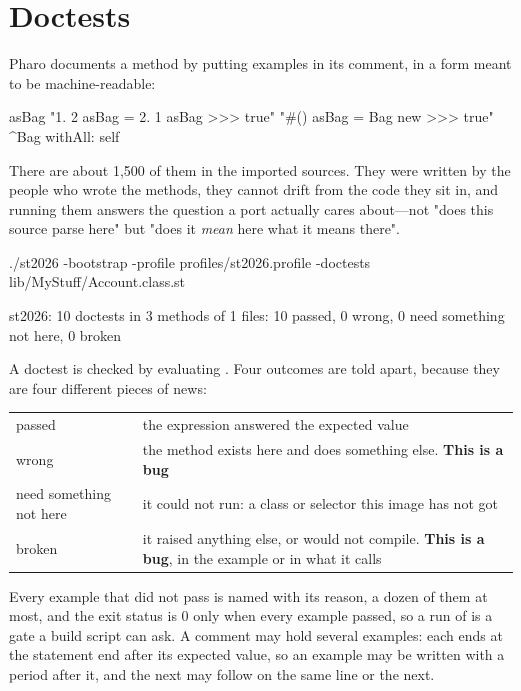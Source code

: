 \section{Doctests}

Pharo documents a method by putting examples in its comment, in a form meant
to be machine-readable:

\begin{st}
asBag
	"{1. 2} asBag = {2. 1} asBag >>> true"
	"#() asBag = Bag new >>> true"
	^Bag withAll: self
\end{st}

There are about 1,500 of them in the imported sources. They were written by
the people who wrote the methods, they cannot drift from the code they sit in,
and running them answers the question a port actually cares about---not "does
this source parse here" but "does it \emph{mean} here what it means there".

\begin{sh}
./st2026 -bootstrap -profile profiles/st2026.profile -doctests lib/MyStuff/Account.class.st
\end{sh}

\begin{plain}
st2026: 10 doctests in 3 methods of 1 files: 10 passed, 0 wrong,
      0 need something not here, 0 broken
\end{plain}

A doctest is checked by evaluating . Four
outcomes are told apart, because they are four different pieces of news:

\begin{center}
\small
\begin{tabular}{@{}lp{}@{}}
\toprule
passed & the expression answered the expected value\\
wrong & the method exists here and does something else. \textbf{This is a
  bug}\\
need something not here & it could not run: a class or selector this image has
  not got\\
broken & it raised anything else, or would not compile. \textbf{This is a
  bug}, in the example or in what it calls\\
\bottomrule
\end{tabular}
\end{center}

Every example that did not pass is named with its reason, a dozen of them at
most, and the exit status is 0 only when every example passed, so a run of
 is a gate a build script can ask. A comment may hold several
examples: each ends at the statement end after its expected value, so an
example may be written with a period after it, and the next may follow on
the same line or the next.

